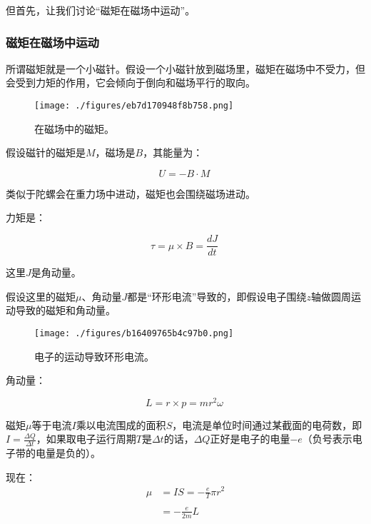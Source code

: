 但首先，让我们讨论“磁矩在磁场中运动”。

\subsubsection{磁矩在磁场中运动}

所谓磁矩就是一个小磁针。假设一个小磁针放到磁场里，磁矩在磁场中不受力，但会受到力矩的作用，它会倾向于倒向和磁场平行的取向。

\begin{figure}[ht]
\centering
\texttt{[image: ./figures/eb7d170948f8b758.png]}
\caption{在磁场中的磁矩。} \label{fig_QMPre2_12}
\end{figure}

假设磁针的磁矩是$M$，磁场是$B$，其能量为：

\begin{equation}
U = - B \cdot M~
\end{equation}

类似于陀螺会在重力场中进动，磁矩也会围绕磁场进动。

力矩是：

\begin{equation}
\tau = \mu \times B = \frac{d J}{d t}~
\end{equation}

这里$J$是角动量。

假设这里的磁矩$\mu $、角动量$J $都是“环形电流”导致的，即假设电子围绕$z$轴做圆周运动导致的磁矩和角动量。

\begin{figure}[ht]
\centering
\texttt{[image: ./figures/b16409765b4c97b0.png]}
\caption{电⼦的运动导致环形电流。} \label{fig_QMPre2_14}
\end{figure}

角动量：

\begin{equation}
L = r \times p =  m r^2 \omega ~
\end{equation}

磁矩$\mu$等于电流$I$乘以电流围成的面积$S$，电流是单位时间通过某截面的电荷数，即$I = \frac{\Delta Q}{\Delta t}$，如果取电子运行周期$T$是$\Delta t $的话，$\Delta Q$正好是电子的电量$- e$（负号表示电子带的电量是负的）。

现在：
\begin{align}
\mu &= IS = -\frac{e}{T} \pi r^2 \\\\
    &= -\frac{e}{2m} L~
\end{align}


